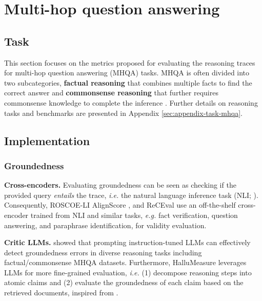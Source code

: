 
\section{Multi-hop question answering}
\label{sec:mhqa}


\subsection{Task}

This section focuses on the metrics proposed for evaluating the reasoning traces for multi-hop question answering (MHQA) tasks. MHQA is often divided into two subcategories, \textbf{factual reasoning} that combines multiple facts to find the correct answer \citep{yang-etal-2018-hotpotqa, talmor-berant-2018-web, kwiatkowski-etal-2019-natural} and \textbf{commonsense reasoning} that further requires commonsense knowledge to complete the inference \citep{clark2018thinksolvedquestionanswering, talmor-etal-2019-commonsenseqa, geva-etal-2021-aristotle, trivedi-etal-2022-musique}. Further details on reasoning tasks and benchmarks are presented in Appendix \ref{sec:appendix-task-mhqa}.

\subsection{Implementation}

\subsubsection{Groundedness}

\textbf{Cross-encoders.} \hspace{0.1cm} Evaluating groundedness can be seen as checking if the provided query \textit{entails} the trace, \textit{i.e.} the natural language inference task (NLI; \citet{bowman-etal-2015-large}). Consequently, ROSCOE-LI \citep{DBLP:conf/iclr/GolovnevaCPCZFC23} AlignScore \citep{zha-etal-2023-alignscore}, and ReCEval \citep{prasad-etal-2023-receval} use an off-the-shelf cross-encoder trained from NLI and similar tasks, \textit{e.g.} fact verification, question answering, and paraphrase identification, for validity evaluation.

\textbf{Critic LLMs.} \hspace{0.1cm} \citet{jacovi-etal-2024-chain, wu-etal-2024-mitigating, niu2024ragtruthhallucinationcorpusdeveloping} showed that prompting instruction-tuned LLMs can effectively detect groundedness errors in diverse reasoning tasks including factual/commonsense MHQA datasets. 
Furthermore, HalluMeasure \citep{akbar-etal-2024-hallumeasure} leverages LLMs for more fine-grained evaluation, \textit{i.e.} (1) decompose reasoning steps into atomic claims and (2) evaluate the groundedness of each claim based on the retrieved documents, inspired from \citet{min-etal-2023-factscore}.

